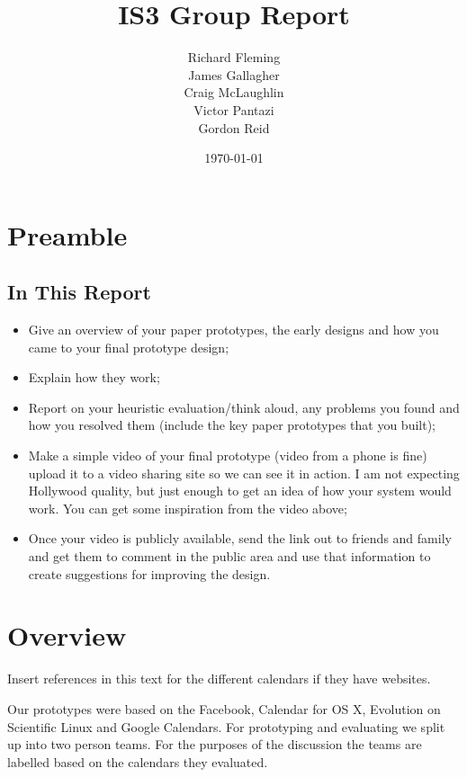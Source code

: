 \documentclass{article}
\title{IS3 Group Report}
\author{
  Richard Fleming \\
  James Gallagher \\
  Craig McLaughlin \\
  Victor Pantazi \\
  Gordon Reid}
\date{\today}
\begin{document}

\maketitle


\section{Preamble}

\subsection{In This Report}

\begin{itemize}
\item Give an overview of your paper prototypes, the early designs and
how you came to your final prototype design;

\item Explain how they work;

\item Report on your heuristic evaluation/think aloud, any problems you
found and how you resolved them (include the key paper prototypes that
you built);

\item Make a simple video of your final prototype (video from a phone
is fine) upload it to a video sharing site so we can see it in action.
I am not expecting Hollywood quality, but just enough to get an idea
of how your system would work. You can get some inspiration from the
video above;

\item Once your video is publicly available, send the link out to
friends and family and get them to comment in the public area and use
that information to create suggestions for improving the design.
\end{itemize}

\section{Overview}

Insert references in this text for the different calendars if they
have websites.

Our prototypes were based on the Facebook, Calendar for OS X,
Evolution on Scientific Linux and Google Calendars. For prototyping and
evaluating we split up into two person teams. For the purposes of the
discussion the teams are labelled based on the calendars they
evaluated.
\end{document}
